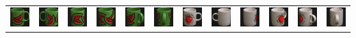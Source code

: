 \documentclass[dutch]{beamer}
\theoremstyle{definition}
\theoremstyle{remark}
\theoremstyle{example}
\begin{document}
{\begin{center}
\begin{tabular}{c@{\ }c@{}c@{}c@{}c@{}c c@{\ }c@{}c@{}c@{}c@{}c}
\includegraphics[width=0.8cm]{coil/beeld-30.eps} &
\includegraphics[width=0.8cm]{coil/beeld-31.eps} &
\includegraphics[width=0.8cm]{coil/beeld-32.eps} &
\includegraphics[width=0.8cm]{coil/beeld-33.eps} &
\includegraphics[width=0.8cm]{coil/beeld-34.eps} &
\includegraphics[width=0.8cm]{coil/beeld-35.eps} &

\includegraphics[width=0.8cm]{coil/beeld-36.eps} &
\includegraphics[width=0.8cm]{coil/beeld-37.eps} &
\includegraphics[width=0.8cm]{coil/beeld-38.eps} &
\includegraphics[width=0.8cm]{coil/beeld-39.eps} &
\includegraphics[width=0.8cm]{coil/beeld-40.eps} &
\includegraphics[width=0.8cm]{coil/beeld-41.eps} \\


\end{tabular}
\end{center}}
\end{document}
